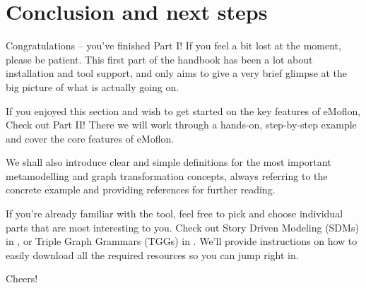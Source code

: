 \newpage
\hypertarget{conclusion}{} 
\section{Conclusion and next steps}
\genHeader

Congratulations -- you've finished Part I! If you feel a bit lost at the moment, please be patient. This first part of the handbook has been a lot about
installation and tool support, and only aims to give a very brief glimpse at the big picture of what is actually going on.

If you enjoyed this section and wish to get started on the key features of eMoflon, Check out Part II! There we will work through a hands-on, step-by-step
example and cover the core features of eMoflon.

We shall also introduce clear and simple definitions for the most important metamodelling and graph transformation concepts, always referring to the concrete
example and providing references for further reading.

If you're already familiar with the tool, feel free to pick and choose individual parts that are most interesting to you.
Check out Story Driven Modeling (SDMs) in , or Triple Graph Grammars (TGGs) in .
We'll provide instructions on how to easily download all the required resources so you can jump right in.


Cheers!